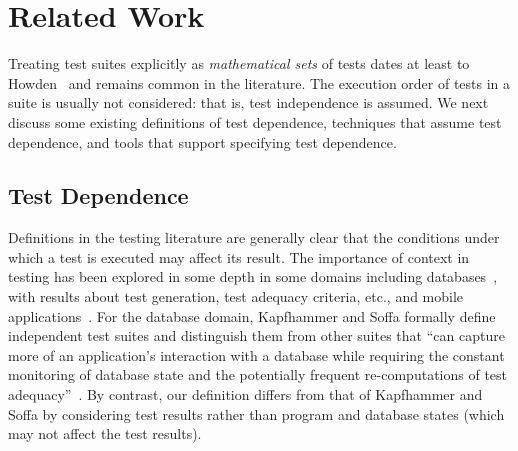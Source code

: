 \section{Related Work}
\label{sec:related}


Treating test suites explicitly as \emph{mathematical sets} of tests dates at least
to Howden~\cite[p.~554]{howden:ToC:1975} and remains common in the literature.
The execution order of tests in a suite is usually not considered:
that is, test independence is assumed. We next discuss some
existing definitions of test dependence, techniques that
assume test dependence, and tools that support specifying
test dependence.


\subsection{Test Dependence}

Definitions in the testing literature are generally clear that the
conditions under which a test is executed may affect its result. 
The
importance of context in testing has been explored in some depth in
some domains including databases~\cite{Gray:1994:QGB:191843.191886,Chays:2000:FTD:347324.348954,
kapfhammeretal:FSE:2003}, with results about test
generation, test adequacy criteria, etc., and mobile
applications~\cite{Wang:2007:AGC}.
For the database domain, Kapfhammer and Soffa formally
define independent test suites and distinguish them from
other suites that ``can capture more of an application's
interaction with a database while requiring the constant monitoring of
database state and the potentially frequent re-computations of test
adequacy''~\cite[p.~101]{kapfhammeretal:FSE:2003}.
By contrast, our definition differs from that of Kapfhammer
and Soffa by considering
test results rather than program and database states
(which may not affect the test results).

